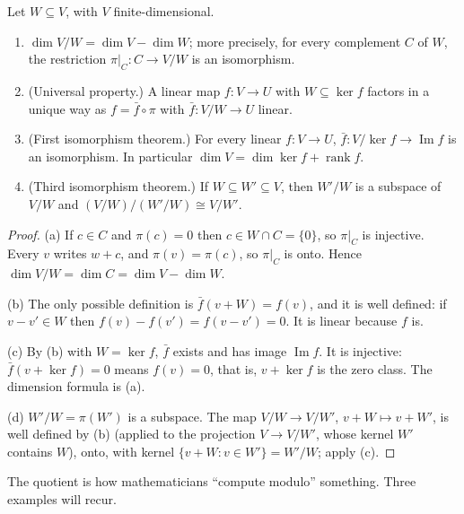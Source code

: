 \begin{theorem}[quotients]\label{thm:quotient}
Let $W\subseteq V$, with $V$ finite-dimensional.
\begin{enumerate}[label=(\alph*)]
\item $\dim V/W=\dim V-\dim W$; more precisely, for every complement $C$ of $W$, the restriction $\pi|_C:C\to V/W$ is an
isomorphism.
\item (Universal property.) A linear map $f:V\to U$ with $W\subseteq\ker f$ factors in a unique way as $f=\bar f\circ\pi$
with $\bar f:V/W\to U$ linear.
\item (First isomorphism theorem.) For every linear $f:V\to U$, $\bar f:V/\ker f\to\operatorname{Im}f$ is an
isomorphism. In particular $\dim V=\dim\ker f+\operatorname{rank}f$.
\item (Third isomorphism theorem.) If $W\subseteq W'\subseteq V$, then $W'/W$ is a subspace of $V/W$ and
$(V/W)/(W'/W)\cong V/W'$.
\end{enumerate}
\end{theorem}
\begin{proof}
(a) If $c\in C$ and $\pi(c)=0$ then $c\in W\cap C=\{0\}$, so $\pi|_C$ is injective. Every $v$ writes $w+c$, and
$\pi(v)=\pi(c)$, so $\pi|_C$ is onto. Hence $\dim V/W=\dim C=\dim V-\dim W$.

(b) The only possible definition is $\bar f(v+W)=f(v)$, and it is well defined: if $v-v'\in W$ then $f(v)-f(v')=f(v-v')=0$.
It is linear because $f$ is.

(c) By (b) with $W=\ker f$, $\bar f$ exists and has image $\operatorname{Im}f$. It is injective: $\bar f(v+\ker f)=0$ means
$f(v)=0$, that is, $v+\ker f$ is the zero class. The dimension formula is (a).

(d) $W'/W=\pi(W')$ is a subspace. The map $V/W\to V/W'$, $v+W\mapsto v+W'$, is well defined by (b) (applied to the
projection $V\to V/W'$, whose kernel $W'$ contains $W$), onto, with kernel $\{v+W:v\in W'\}=W'/W$; apply (c).
\end{proof}

The quotient is how mathematicians ``compute modulo'' something. Three examples will recur.

